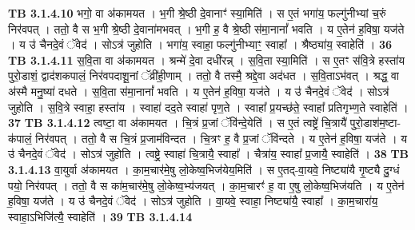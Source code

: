 \documentclass[17pt]{extarticle}
\begin{document}
{{                  \newline
                                \textbf{ TB 3.1.4.10} \newline
                  भगो॒ वा अ॑कामयत । भ॒गी श्रे॒ष्ठी दे॒वानाꣳ॑ स्या॒मिति॑ । स ए॒तं भगा॑य॒ फल्गु॑नीभ्यां च॒रुं निर॑वपत् । ततो॒ वै स भ॒गी श्रे॒ष्ठी दे॒वाना॑मभवत् । भ॒गी ह॒ वै श्रे॒ष्ठी स॑मा॒नानां᳚ भवति । य ए॒तेन॑ ह॒विषा॒ यज॑ते । य उ॑ चैनदे॒वं ॅवेद॑ । सोऽत्र॑ जुहोति । भगा॑य॒ स्वाहा॒ फल्गु॑नीभ्याꣳ॒॒ स्वाहा᳚ । श्रैष्ठ्या॑य॒ स्वाहेति॑ । \textbf{ 36} \newline
                  \newline
                                \textbf{ TB 3.1.4.11} \newline
                  स॒वि॒ता वा अ॑कामयत । श्रन्मे॑ दे॒वा दधी॑रन्न् । स॒वि॒ता स्या॒मिति॑ । स ए॒तꣳ स॑वि॒त्रे हस्ता॑य पुरो॒डाशं॒ द्वाद॑शकपालं॒ निर॑वपदाशू॒नां ॅव्री॑ही॒णाम् । ततो॒ वै तस्मै॒ श्रद्दे॒वा अद॑धत । स॒वि॒ताऽभ॑वत् । श्रद्ध॒ वा अ॑स्मै मनु॒ष्या॑ दधते । स॒वि॒ता स॑मा॒नानां᳚ भवति । य ए॒तेन॑ ह॒विषा॒ यज॑ते । य उ॑ चैनदे॒वं ॅवेद॑ । सोऽत्र॑ जुहोति । स॒वि॒त्रे स्वाहा॒ हस्ता॑य । स्वाहा॑ दद॒ते स्वाहा॑ पृण॒ते । स्वाहा᳚ प्र॒यच्छ॑ते॒ स्वाहा᳚ प्रतिगृभ्ण॒ते स्वाहेति॑ । \textbf{ 37} \newline
                  \newline
                                \textbf{ TB 3.1.4.12} \newline
                  त्वष्टा॒ वा अ॑कामयत । चि॒त्रं प्र॒जां ॅवि॑न्दे॒येति॑ । स ए॒तं त्वष्ट्रे॑ चि॒त्रायै॑ पुरो॒डाश॑म॒ष्टा-क॑पालं॒ निर॑वपत् । ततो॒ वै स चि॒त्रं प्र॒जाम॑विन्दत । चि॒त्रꣳ ह॒ वै प्र॒जां ॅवि॑न्दते । य ए॒तेन॑ ह॒विषा॒ यज॑ते । य उ॑ चैनदे॒वं ॅवेद॑ । सोऽत्र॑ जुहोति । त्वष्ट्रे॒ स्वाहा॑ चि॒त्रायै॒ स्वाहा᳚ । चैत्रा॑य॒ स्वाहा᳚ प्र॒जायै॒ स्वाहेति॑ । \textbf{ 38} \newline
                  \newline
                                \textbf{ TB 3.1.4.13} \newline
                  वा॒युर्वा अ॑कामयत । का॒म॒चार॑मे॒षु लो॒केष्व॒भिज॑येय॒मिति॑ । स ए॒तद्-वा॒यवे॒ निष्ट्या॑यै गृ॒ष्ट्यै दु॒ग्धं पयो॒ निर॑वपत् । ततो॒ वै स का॑म॒चार॑मे॒षु लो॒केष्व॒भ्य॑जयत् । का॒म॒चारꣳ॑ ह॒ वा ए॒षु लो॒केष्व॒भिज॑यति । य ए॒तेन॑ ह॒विषा॒ यज॑ते । य उ॑ चैनदे॒वं ॅवेद॑ । सोऽत्र॑ जुहोति । वा॒यवे॒ स्वाहा॒ निष्ट्या॑यै॒ स्वाहा᳚ । का॒म॒चारा॑य॒ स्वाहा॒ऽभिजि॑त्यै॒ स्वाहेति॑ । \textbf{ 39} \newline
                  \newline
                                \textbf{ TB 3.1.4.14} \newline
}}
\end{document}

